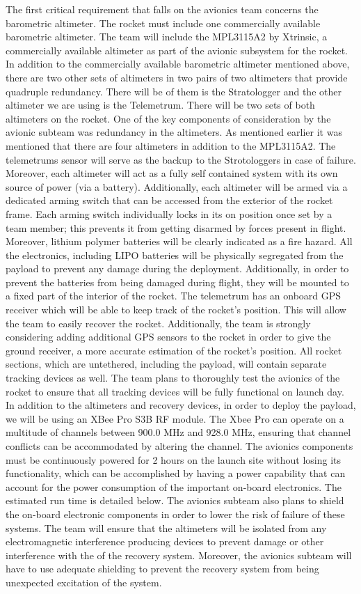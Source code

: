 The first critical requirement that falls on the avionics team concerns the barometric altimeter. The rocket must include one commercially available barometric altimeter. The team will include the MPL3115A2 by Xtrinsic, a commercially available altimeter as part of the avionic subsystem for the rocket. 
In addition to the commercially available barometric altimeter mentioned above, there are two other sets of altimeters in two pairs of two altimeters that provide quadruple redundancy. There will be of them is the Stratologger and the other altimeter we are using is the Telemetrum. There will be two sets of both altimeters on the rocket. One of the key components of consideration by the avionic subteam was redundancy in the altimeters. As mentioned earlier it was mentioned that there are four altimeters in addition to the  MPL3115A2. The telemetrums sensor will serve as the backup to the Strotologgers in case of failure. Moreover, each altimeter will act as a fully self contained system with its own source of power (via a battery). Additionally, each altimeter will be armed via a dedicated arming switch that can be accessed from the exterior of the rocket frame. Each arming switch individually locks in its on position once set by a team member; this prevents it from getting disarmed by forces present in flight. Moreover, lithium polymer batteries will be clearly indicated as a fire hazard. All the electronics, including LIPO batteries will be physically segregated from the payload to prevent any damage during the deployment. Additionally, in order to prevent the batteries from being damaged during flight, they will be mounted to a fixed part of the interior of the rocket. 
The telemetrum has an onboard GPS receiver which will be able to keep track of the rocket’s position. This will allow the team to easily recover the rocket. Additionally, the team is strongly considering adding additional GPS sensors to the rocket in order to give the ground receiver, a more accurate estimation of the rocket’s position. All rocket sections, which are untethered, including the payload, will contain separate tracking devices as well. The team plans to thoroughly test the avionics of the rocket to ensure that all tracking devices will be fully functional on launch day.
In addition to the altimeters and recovery devices, in order to deploy the payload, we will be using an XBee Pro S3B RF module. The Xbee Pro can operate on a multitude of channels between 900.0 MHz and 928.0 MHz, ensuring that channel conflicts can be accommodated by altering the channel. The avionics components must be continuously powered for 2 hours on the launch site without losing its functionality, which can be accomplished by having a power capability that can account for the power consumption of the important on-board electronics. The estimated run time is detailed below.
The avionics subteam also plans to shield the on-board electronic components in order to lower the risk of failure of these systems. The team will ensure that the altimeters will be isolated from any electromagnetic interference producing devices to prevent damage or other interference with the of the recovery system. Moreover, the avionics subteam will have to use adequate shielding to prevent the recovery system from being unexpected excitation of the system. 
